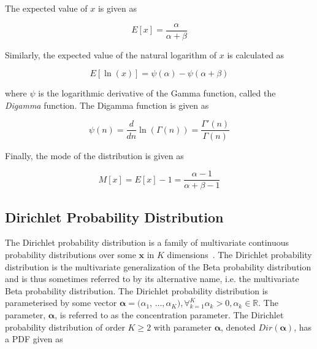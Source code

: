 The expected value of $x$ is given as

\begin{equation}
      \label{eq:probability:probability_distributions:beta:expected_value}
      E[x] = \frac{\alpha}{\alpha + \beta}
\end{equation}

Similarly, the expected value of the natural logarithm of $x$ is calculated as

\begin{equation}
      \label{eq:probability:probability_distributions:beta:expected_value_ln}
      E[\ln(x)] = \psi({\alpha}) - \psi(\alpha + \beta)
\end{equation}

where $\psi$ is the logarithmic derivative of the Gamma function, called the \textit{Digamma} function. The Digamma function is given as

\begin{equation}
      \label{eq:probability:probability_distributions:beta:digamma}
      \psi(n) = \frac{d}{dn}\ln(\Gamma(n)) = \frac{\Gamma'(n)}{\Gamma(n)}
\end{equation}

Finally, the mode of the distribution is given as

\begin{equation}
      \label{eq:probability:probability_distributions:beta:mode}
      M[x] = E[x] - 1 = \frac{\alpha - 1}{\alpha + \beta - 1}
\end{equation}


\subsection{Dirichlet Probability Distribution}\label{sec:probability:probability_distributions:dirichlet}

The Dirichlet probability distribution is a family of multivariate continuous probability distributions over some $\boldsymbol{x}$ in $K$ dimensions~\cite{ref:wackerly:2014}. The Dirichlet probability distribution is the multivariate generalization of the Beta probability distribution and is thus sometimes referred to by its alternative name, i.e. the multivariate Beta probability distribution. The Dirichlet probability distribution is parameterised by some vector $\boldsymbol{\alpha} = (\alpha_{1}$,  $\dots, \alpha_{K}), \forall_{k=1}^{K} \alpha_{k} > 0, \alpha_{k} \in \mathbb{R}$. The parameter, $\boldsymbol{\alpha}$, is referred to as the concentration parameter. The Dirichlet probability distribution of order $K \geq 2$ with parameter $\boldsymbol{\alpha}$, denoted $Dir(\boldsymbol{\alpha})$, has a \acs{PDF} given as

